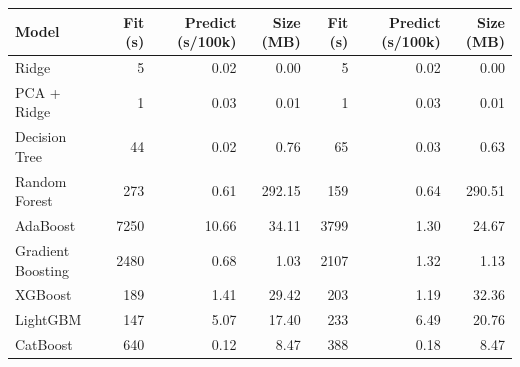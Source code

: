 \begin{tabular}{lrrrrrr}
\toprule
Model & Fit (s) & Predict (s/100k) & Size (MB) & Fit (s) & Predict (s/100k) & Size (MB) \\
\midrule
Ridge & 5 & 0.02 & 0.00 & 5 & 0.02 & 0.00 \\
PCA + Ridge & 1 & 0.03 & 0.01 & 1 & 0.03 & 0.01 \\
Decision Tree & 44 & 0.02 & 0.76 & 65 & 0.03 & 0.63 \\
Random Forest & 273 & 0.61 & 292.15 & 159 & 0.64 & 290.51 \\
AdaBoost & 7250 & 10.66 & 34.11 & 3799 & 1.30 & 24.67 \\
Gradient Boosting & 2480 & 0.68 & 1.03 & 2107 & 1.32 & 1.13 \\
XGBoost & 189 & 1.41 & 29.42 & 203 & 1.19 & 32.36 \\
LightGBM & 147 & 5.07 & 17.40 & 233 & 6.49 & 20.76 \\
CatBoost & 640 & 0.12 & 8.47 & 388 & 0.18 & 8.47 \\
\bottomrule
\end{tabular}
